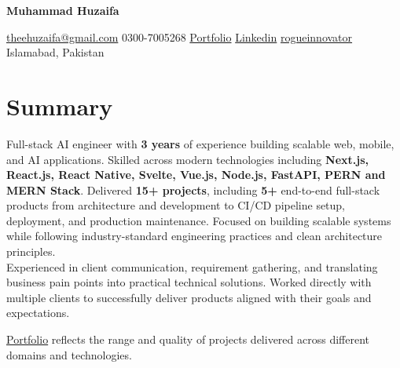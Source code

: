\documentclass[10pt, letterpaper]{article}
\newenvironment{header}{
    \setlength{\topsep}{0pt}\par\kern\topsep\centering\color{primaryColor}\linespread{1.5}
}{
    \par\kern\topsep
}
\let\hrefWithoutArrow\href
\renewcommand{\href}[2]{\hrefWithoutArrow{#1}{\ifthenelse{\equal{#2}{}}{ }{#2 }\raisebox{.15ex}{\footnotesize \faExternalLink*}}}
\begin{document}
\newcommand{\AND}{\unskip
	\cleaders\copy\ANDbox\hskip\wd\ANDbox
	\ignorespaces
}
\newsavebox\ANDbox
\sbox\ANDbox{}

\begin{header}
	\centering
	\fontsize{30pt}{30pt}\selectfont
	\textbf{Muhammad Huzaifa}

	\vspace{0.4cm}

	\normalsize
	\hrefWithoutArrow{mailto:theehuzaifa@gmail.com}{{\faEnvelope[regular]}\hspace{0.01cm} theehuzaifa@gmail.com} \quad
	{\faPhone*} \hspace{0.01cm} 0300-7005268 \quad
	\hrefWithoutArrow{https://muhammad-huzaifa-s-e.vercel.app}{{\faLink}\hspace{0.01cm} Portfolio} \quad
	\hrefWithoutArrow{https://www.linkedin.com/in/muhammad-huzaifa-ali-49aa94259/}{{\faLinkedinIn} \hspace{0.01cm}  Linkedin} \quad
	\hrefWithoutArrow{https://github.com/rogueinnovator}{{\faGithub}\hspace{0.01cm}  rogueinnovator} \quad
	{\faMapMarker*} Islamabad, Pakistan
\end{header}
\vspace{0.3 cm - 0.3 cm}
\section{Summary}
Full-stack AI engineer with \textbf{3 years} of experience building scalable web, mobile, and AI applications. Skilled across modern technologies including \textbf{Next.js, React.js, React Native, Svelte, Vue.js, Node.js, FastAPI, PERN and  MERN Stack}.
Delivered \textbf{15+ \hspace{0.01em} projects}, including \textbf{5+} end-to-end full-stack products from architecture and development to CI/CD pipeline setup, deployment, and production maintenance. Focused on building scalable systems while following industry-standard engineering practices and clean architecture principles.
\vspace{0.5em}
\\
Experienced in client communication, requirement gathering, and translating business pain points into practical technical solutions. Worked directly with multiple clients to successfully deliver products aligned with their goals and expectations.
\vspace{0.5em}

\hrefWithoutArrow{https://muhammad-huzaifa-s-e.vercel.app}{Portfolio}
reflects the range and quality of projects delivered across different domains and technologies.\vspace{0.5em}
\end{document}
